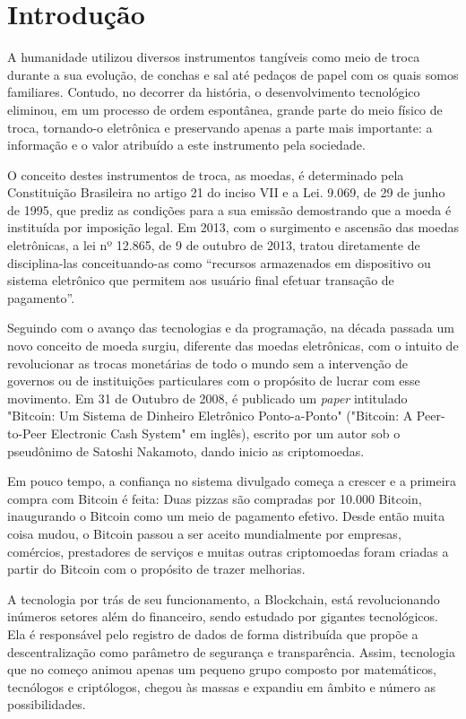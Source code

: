 \chapter{Introdução}

A humanidade utilizou diversos instrumentos tangíveis como meio de troca durante a sua evolução, de conchas e sal até pedaços de papel com os quais somos familiares. Contudo, no decorrer da história, o desenvolvimento tecnológico eliminou, em um processo de ordem espontânea, grande parte do meio físico de troca, tornando-o eletrônica e preservando apenas a parte mais importante: a informação e o valor atribuído a este instrumento pela sociedade. 

O conceito destes instrumentos de troca, as moedas, é determinado pela Constituição Brasileira no artigo 21 do inciso VII e a Lei. 9.069, de 29 de junho de 1995, que prediz as condições para a sua emissão demostrando que a moeda é instituída por imposição legal. Em 2013, com o surgimento e ascensão das moedas eletrônicas, a lei nº 12.865, de 9 de outubro de 2013, tratou diretamente de disciplina-las conceituando-as como “recursos armazenados em dispositivo ou sistema eletrônico que permitem aos usuário final efetuar transação de pagamento”.

Seguindo com o avanço das tecnologias e da programação, na década passada um novo conceito de moeda surgiu, diferente das moedas eletrônicas, com o intuito de revolucionar as trocas monetárias de todo o mundo sem a intervenção de governos ou de instituições particulares com o propósito de lucrar com esse movimento. Em 31 de Outubro de 2008, é publicado um \textit{paper} intitulado "Bitcoin: Um Sistema de Dinheiro Eletrônico Ponto-a-Ponto"  ("Bitcoin: A Peer-to-Peer Electronic Cash System" em inglês), escrito por um autor sob o pseudônimo de Satoshi Nakamoto, dando inicio as criptomoedas.

Em pouco tempo, a confiança no sistema divulgado começa a crescer e a primeira compra com Bitcoin é feita: Duas pizzas são compradas por 10.000 Bitcoin, inaugurando o Bitcoin como um meio de pagamento efetivo. Desde então muita coisa mudou, o Bitcoin passou a ser aceito mundialmente por empresas, comércios, prestadores de serviços e muitas outras criptomoedas foram criadas a partir do Bitcoin com o propósito de trazer melhorias. 

A tecnologia por trás de seu funcionamento, a Blockchain, está revolucionando inúmeros setores além do financeiro, sendo estudado por gigantes tecnológicos. Ela é responsável pelo registro de dados de forma distribuída que propõe a descentralização como parâmetro de segurança e transparência. Assim, tecnologia que no começo animou apenas um pequeno grupo composto por matemáticos, tecnólogos e criptólogos, chegou às massas e expandiu em âmbito e número as possibilidades. 

